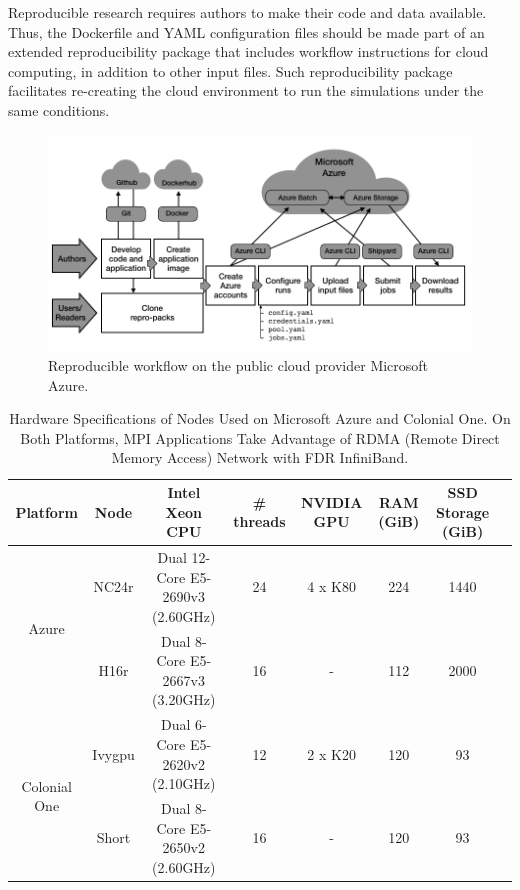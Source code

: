 \documentclass[10pt,journal,compsoc]{IEEEtran}
\begin{document}
Reproducible research requires authors to make their code and data available.
Thus, the Dockerfile and YAML configuration files should be made part of an extended reproducibility package that includes workflow instructions for cloud computing, in addition to other input files.
Such reproducibility package facilitates re-creating the cloud environment to run the simulations under the same conditions.

\begin{figure}[!h]
    \centering
    \includegraphics[width=14cm]{figures/cloud_workflow.png}
    \caption{Reproducible workflow on the public cloud provider Microsoft Azure.}
    \label{fig:cloud_workflow}
\end{figure}

\begin{table}[!h]
    \renewcommand{\arraystretch}{1.5}
    \caption{Hardware Specifications of Nodes Used on Microsoft Azure and Colonial One. On Both Platforms, MPI Applications Take Advantage of RDMA (Remote Direct Memory Access) Network with FDR InfiniBand.}
    \label{tab:hw_specs}
    \centering
    \begin{tabular}{cccccccc}
        Platform & Node & Intel Xeon CPU & \# threads & NVIDIA GPU & RAM (GiB) & SSD Storage (GiB) \\
        \hline
        \multirow{2}{*}{Azure} & NC24r & Dual 12-Core E5-2690v3 (2.60GHz) & 24 & 4 x K80 & 224 & 1440 \\
        & H16r & Dual 8-Core E5-2667v3 (3.20GHz) & 16 & - & 112 & 2000 \\
        \hline
        \multirow{2}{*}{Colonial One} & Ivygpu & Dual 6-Core E5-2620v2 (2.10GHz) & 12 & 2 x K20 & 120 & 93 \\
        & Short & Dual 8-Core E5-2650v2 (2.60GHz) & 16 & - & 120 & 93 \\
        \hline
    \end{tabular}
\end{table}
\end{document}
